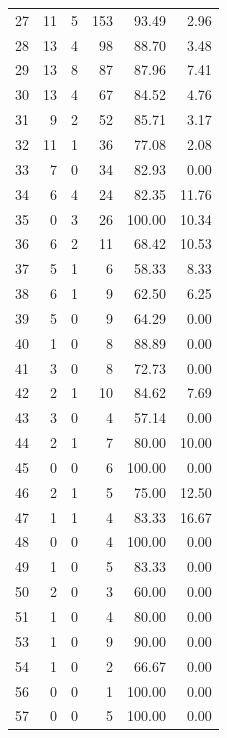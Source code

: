 \documentclass[11pt]{article}
\begin{document}
\begin{longtable}{r|r|r|r|r|r}
    27    & 11    & 5     & 153   & 93.49 & 2.96 \\
    28    & 13    & 4     & 98    & 88.70 & 3.48 \\
    29    & 13    & 8     & 87    & 87.96 & 7.41 \\
    30    & 13    & 4     & 67    & 84.52 & 4.76 \\
    31    & 9     & 2     & 52    & 85.71 & 3.17 \\
    32    & 11    & 1     & 36    & 77.08 & 2.08 \\
    33    & 7     & 0     & 34    & 82.93 & 0.00 \\
    34    & 6     & 4     & 24    & 82.35 & 11.76 \\
    35    & 0     & 3     & 26    & 100.00 & 10.34 \\
    36    & 6     & 2     & 11    & 68.42 & 10.53 \\
    37    & 5     & 1     & 6     & 58.33 & 8.33 \\
    38    & 6     & 1     & 9     & 62.50 & 6.25 \\
    39    & 5     & 0     & 9     & 64.29 & 0.00 \\
    40    & 1     & 0     & 8     & 88.89 & 0.00 \\
    41    & 3     & 0     & 8     & 72.73 & 0.00 \\
    42    & 2     & 1     & 10    & 84.62 & 7.69 \\
    43    & 3     & 0     & 4     & 57.14 & 0.00 \\
    44    & 2     & 1     & 7     & 80.00 & 10.00 \\
    45    & 0     & 0     & 6     & 100.00 & 0.00 \\
    46    & 2     & 1     & 5     & 75.00 & 12.50 \\
    47    & 1     & 1     & 4     & 83.33 & 16.67 \\
    48    & 0     & 0     & 4     & 100.00 & 0.00 \\
    49    & 1     & 0     & 5     & 83.33 & 0.00\\
    50    & 2     & 0     & 3     & 60.00 & 0.00\\
    51    & 1     & 0     & 4     & 80.00 & 0.00\\
    53    & 1     & 0     & 9     & 90.00 & 0.00\\
    54    & 1     & 0     & 2     & 66.67 & 0.00\\
    56    & 0     & 0     & 1     & 100.00 & 0.00 \\
    57    & 0     & 0     & 5     & 100.00 & 0.00 \\

\end{longtable}
\end{document}
